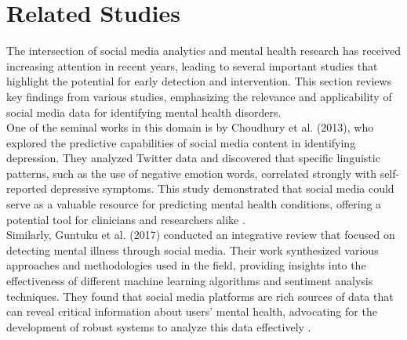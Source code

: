
\section{Related Studies}

\begin{comment}
    For avoiding plagiarism, citations should be used for all referred texts particularly here and other parts of the document using appropriate numbers within square bracket for all mapped references under \textbf{References} section. You should check any standard journal paper for typical use of citations.     
\end{comment}

\noindent
The intersection of social media analytics and mental health research has received increasing attention in recent years, leading to several important studies that highlight the potential for early detection and intervention. This section reviews key findings from various studies, emphasizing the relevance and applicability of social media data for identifying mental health disorders. \\

\noindent
One of the seminal works in this domain is by Choudhury et al. (2013), who explored the predictive capabilities of social media content in identifying depression. They analyzed Twitter data and discovered that specific linguistic patterns, such as the use of negative emotion words, correlated strongly with self-reported depressive symptoms. This study demonstrated that social media could serve as a valuable resource for predicting mental health conditions, offering a potential tool for clinicians and researchers alike \cite{Choudhury2013PredictingDV}. \\

\noindent
Similarly, Guntuku et al. (2017) conducted an integrative review that focused on detecting mental illness through social media. Their work synthesized various approaches and methodologies used in the field, providing insights into the effectiveness of different machine learning algorithms and sentiment analysis techniques. They found that social media platforms are rich sources of data that can reveal critical information about users' mental health, advocating for the development of robust systems to analyze this data effectively \cite{Guntuku2017DetectingDA}. \\

